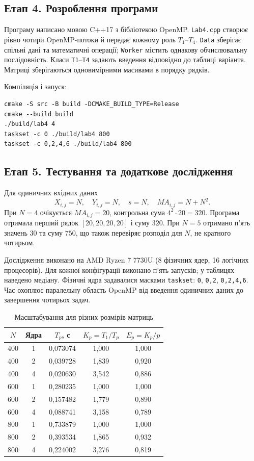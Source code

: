 \documentclass[12pt,a4paper]{article}
\begin{document}
\subsection{Етап 4. Розроблення програми}

Програму написано мовою C++17 з бібліотекою OpenMP. \texttt{Lab4.cpp}
створює рівно чотири OpenMP-потоки й передає кожному роль $T_1$--$T_4$.
\texttt{Data} зберігає спільні дані та математичні операції;
\texttt{Worker} містить однакову обчислювальну послідовність. Класи
\texttt{T1}--\texttt{T4} задають введення відповідно до таблиці варіанта.
Матриці зберігаються одновимірними масивами в порядку рядків.

Компіляція і запуск:
\begin{verbatim}
cmake -S src -B build -DCMAKE_BUILD_TYPE=Release
cmake --build build
./build/lab4 4
taskset -c 0 ./build/lab4 800
taskset -c 0,2,4,6 ./build/lab4 800
\end{verbatim}

\subsection{Етап 5. Тестування та додаткове дослідження}

Для одиничних вхідних даних
\begin{equation}
 X_{i,j}=N,\quad Y_{i,j}=N,\quad s=N,\quad
 MA_{i,j}=N+N^2.
 \label{eq:control}
\end{equation}
При $N=4$ очікується $MA_{i,j}=20$, контрольна сума
$4^2\cdot20=320$. Програма отримала перший рядок
$[20,20,20,20]$ і суму $320$. При $N=5$ отримано п’ять значень $30$ та
суму $750$, що також перевіряє розподіл для $N$, не кратного чотирьом.

Дослідження виконано на AMD Ryzen 7 7730U (8 фізичних ядер, 16 логічних
процесорів). Для кожної конфігурації виконано п’ять запусків; у таблицях
наведено медіану. Фізичні ядра задавалися масками \texttt{taskset}:
\texttt{0}, \texttt{0,2}, \texttt{0,2,4,6}. Час охоплює паралельну
область OpenMP від введення одиничних даних до завершення чотирьох задач.

\begin{table}[H]\centering\renewcommand{\arraystretch}{1.15}
\begin{tabular}{|c|c|c|c|c|}\hline
$N$&\textbf{Ядра}&$T_p$, с&$K_p=T_1/T_p$&$E_p=K_p/p$\\\hline
400&1&0,073074&1,000&1,000\\\hline
400&2&0,039728&1,839&0,920\\\hline
400&4&0,020630&3,542&0,886\\\hline
600&1&0,280235&1,000&1,000\\\hline
600&2&0,157482&1,779&0,890\\\hline
600&4&0,088741&3,158&0,789\\\hline
800&1&0,733879&1,000&1,000\\\hline
800&2&0,393534&1,865&0,932\\\hline
800&4&0,224002&3,276&0,819\\\hline
\end{tabular}
\caption{Масштабування для різних розмірів матриць}
\label{tab:scaling}
\end{table}
\end{document}

